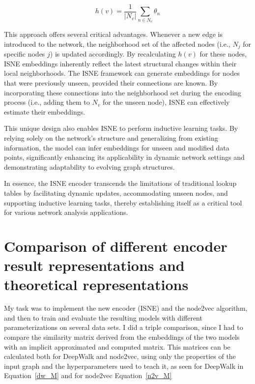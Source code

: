 \begin{equation}
\label{neigborhood}
h(v) = \frac{1}{|N_v|} \sum_{n \in N_v} \theta_n
\end{equation}

This approach offers several critical advantages. Whenever a new edge is introduced to the network, the neighborhood set of the affected nodes (i.e., $N_j$ for specific nodes 
$j$) is updated accordingly. By recalculating ${h(v)}$ for these nodes, ISNE embeddings inherently reflect the latest structural changes within their local neighborhoods. The ISNE framework can generate embeddings for nodes that were previously unseen, provided their connections are known. By incorporating these connections into the neighborhood set during the encoding process (i.e., adding them to $N_v$ for the unseen node), ISNE can effectively estimate their embeddings.

This unique design also enables ISNE to perform inductive learning tasks. By relying solely on the network's structure and generalizing from existing information, the model can infer embeddings for unseen and modified data points, significantly enhancing its applicability in dynamic network settings and demonstrating adaptability to evolving graph structures.

In essence, the ISNE encoder transcends the limitations of traditional lookup tables by facilitating dynamic updates, accommodating unseen nodes, and supporting inductive learning tasks, thereby establishing itself as a critical tool for various network analysis applications.

\section{Comparison of different encoder result representations and theoretical representations}

My task was to implement the new encoder (ISNE) and the node2vec algorithm, and then to train and evaluate the resulting models with different parameterizations on several data sets. I did a triple comparison, since I had to compare the similarity matrix derived from the embeddings of the two models with an implicit approximated and computed matrix. \cite{DBLP:journals/corr/abs-1710-02971} \cite{DBLP:journals/corr/YangL15} This matrices can be calculated both for DeepWalk and node2vec, using only the properties of the input graph and the hyperparameters used to teach it, as seen for DeepWalk in Equation~\ref{dw_M} and for node2vec Equation~\ref{n2v_M}

